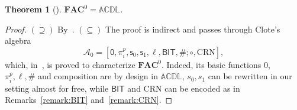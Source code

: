 \documentclass[11pt, oneside]{article}
\newcommand{\ACDL}{\mathbb{ACDL}}
\newcommand{\fun}[1]{\mathsf{#1}}
\newcommand{\AC}{\mathbf{FAC}}
\newtheorem{theorem}{Theorem}
\theoremstyle{definition}
\begin{document}
\begin{theorem}[\cite{ADK24a}]
    $\AC^0=\ACDL$.
\end{theorem}
\begin{proof}
$(\supseteq)$ By~\cite[Prop. 12, 17]{ADK24a}. 
$(\subseteq)$ The proof is indirect and passes through Clote's algebra
$$
\mathcal{A}_0 = [\fun{0}, \pi^p_i, \fun{s}_0, \fun{s}_1, \ell, \fun{BIT}, \#; \circ, \text{CRN}],
$$
which, in~\cite{Clote1990}, is proved to characterize $\AC^0$.
Indeed, its basic functions 0, $\pi^p_i, \ell, \#$ and composition are by design in $\ACDL$, $s_0,s_1$ can be rewritten in our setting almost for free, while $\fun{BIT}$ and CRN can be encoded as in Remarks~\ref{remark:BIT} and~\ref{remark:CRN}.
\end{proof}
\end{document}
